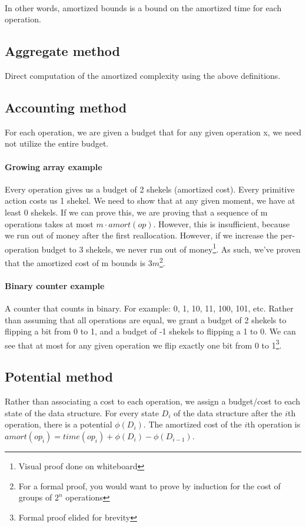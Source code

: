 \documentclass[a4paper]{article}
\begin{document}
\paragraph{}
In other words, amortized bounds is a bound on the amortized time for each operation.

\subsection{Aggregate method}

Direct computation of the amortized complexity using the above definitions.

\subsection{Accounting method}
For each operation, we are given a budget that for any given operation x, we need not utilize the entire budget.

\paragraph{Growing array example}
Every operation gives us a budget of 2 shekels (amortized cost). Every primitive action costs us 1 shekel. We need to show that at any given moment, we have at least 0 shekels. If we can prove this, we are proving that a sequence of m operations takes at most $m\cdot amort(op)$. However, this is insufficient, because we run out of money after the first reallocation. However, if we increase the per-operation budget to 3 shekels, we never run out of money\footnote{Visual proof done on whiteboard}. As such, we've proven that the amortized cost of m bounds is $3m$\footnote{For a formal proof, you would want to prove by induction for the cost of groups of $2^n$ operations}.

\paragraph{Binary counter example}
A counter that counts in binary. For example: 0, 1, 10, 11, 100, 101, etc. Rather than assuming that all operations are equal, we grant a budget of 2 shekels to flipping a bit from 0 to 1, and a budget of -1 shekels to flipping a 1 to 0. We can see that at most for any given operation we flip exactly one bit from 0 to 1\footnote{Formal proof elided for brevity}.

\subsection{Potential method}
Rather than associating a cost to each operation, we assign a budget/cost to each state of the data structure. For every state $D_i$ of the data structure after the $i$th operation, there is a potential $\phi(D_i)$. The amortized cost of the $i$th operation is $amort(op_i)=time(op_i)+\phi(D_i)-\phi(D_{i-1})$.
\end{document}
